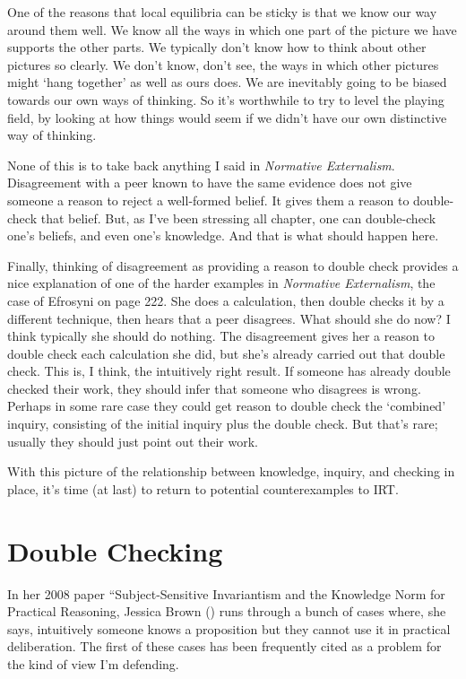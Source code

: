 \documentclass[
  12pt,
  letterpaper,
]{scrbook}
\begin{document}
One of the reasons that local equilibria can be sticky is that we know
our way around them well. We know all the ways in which one part of the
picture we have supports the other parts. We typically don't know how to
think about other pictures so clearly. We don't know, don't see, the
ways in which other pictures might `hang together' as well as ours does.
We are inevitably going to be biased towards our own ways of thinking.
So it's worthwhile to try to level the playing field, by looking at how
things would seem if we didn't have our own distinctive way of thinking.

None of this is to take back anything I said in \emph{Normative
Externalism}. Disagreement with a peer known to have the same evidence
does not give someone a reason to reject a well-formed belief. It gives
them a reason to double-check that belief. But, as I've been stressing
all chapter, one can double-check one's beliefs, and even one's
knowledge. And that is what should happen here.

Finally, thinking of disagreement as providing a reason to double check
provides a nice explanation of one of the harder examples in
\emph{Normative Externalism}, the case of Efrosyni on page 222. She does
a calculation, then double checks it by a different technique, then
hears that a peer disagrees. What should she do now? I think typically
she should do nothing. The disagreement gives her a reason to double
check each calculation she did, but she's already carried out that
double check. This is, I think, the intuitively right result. If someone
has already double checked their work, they should infer that someone
who disagrees is wrong. Perhaps in some rare case they could get reason
to double check the `combined' inquiry, consisting of the initial
inquiry plus the double check. But that's rare; usually they should just
point out their work.

With this picture of the relationship between knowledge, inquiry, and
checking in place, it's time (at last) to return to potential
counterexamples to IRT.

\section{Double Checking}\label{sec-doublecheck}

In her 2008 paper ``Subject-Sensitive Invariantism and the Knowledge
Norm for Practical Reasoning, Jessica Brown
() runs through a bunch of cases where,
she says, intuitively someone knows a proposition but they cannot use it
in practical deliberation. The first of these cases has been frequently
cited as a problem for the kind of view I'm defending.
\end{document}
